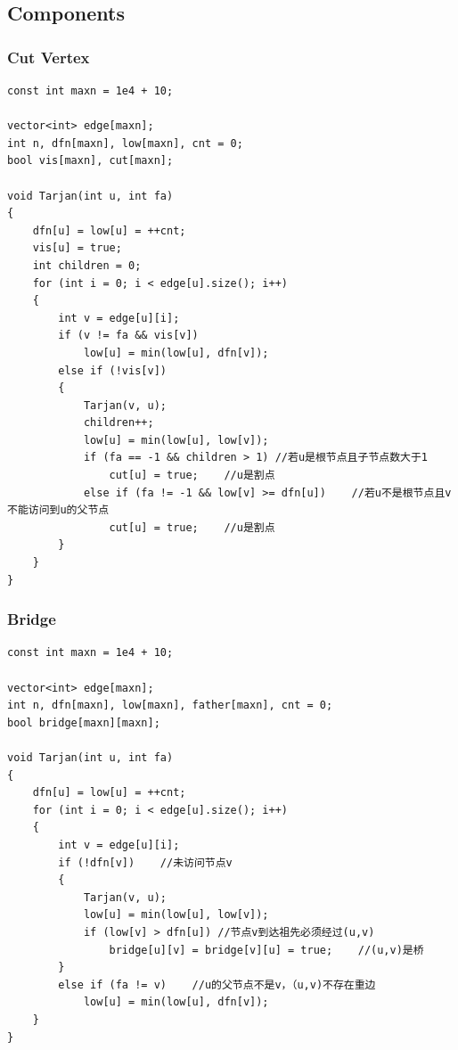 \documentclass[twoside]{article}
\begin{document}
\subsection{Components}
\subsubsection{Cut Vertex}
\begin{lstlisting}
const int maxn = 1e4 + 10;

vector<int> edge[maxn];
int n, dfn[maxn], low[maxn], cnt = 0;
bool vis[maxn], cut[maxn];

void Tarjan(int u, int fa)
{
    dfn[u] = low[u] = ++cnt;
    vis[u] = true;
    int children = 0;
    for (int i = 0; i < edge[u].size(); i++)
    {
        int v = edge[u][i];
        if (v != fa && vis[v])
            low[u] = min(low[u], dfn[v]);
        else if (!vis[v])
        {
            Tarjan(v, u);
            children++;
            low[u] = min(low[u], low[v]);
            if (fa == -1 && children > 1) //若u是根节点且子节点数大于1
                cut[u] = true;    //u是割点
            else if (fa != -1 && low[v] >= dfn[u])    //若u不是根节点且v不能访问到u的父节点
                cut[u] = true;    //u是割点
        }
    }
}\end{lstlisting}
\subsubsection{Bridge}
\begin{lstlisting}
const int maxn = 1e4 + 10;

vector<int> edge[maxn];
int n, dfn[maxn], low[maxn], father[maxn], cnt = 0;
bool bridge[maxn][maxn];

void Tarjan(int u, int fa)
{
    dfn[u] = low[u] = ++cnt;
    for (int i = 0; i < edge[u].size(); i++)
    {
        int v = edge[u][i];
        if (!dfn[v])    //未访问节点v
        {
            Tarjan(v, u);
            low[u] = min(low[u], low[v]);
            if (low[v] > dfn[u]) //节点v到达祖先必须经过(u,v)
                bridge[u][v] = bridge[v][u] = true;    //(u,v)是桥
        } 
        else if (fa != v)    //u的父节点不是v，（u,v)不存在重边
            low[u] = min(low[u], dfn[v]);
    }
}\end{lstlisting}
\end{document}
